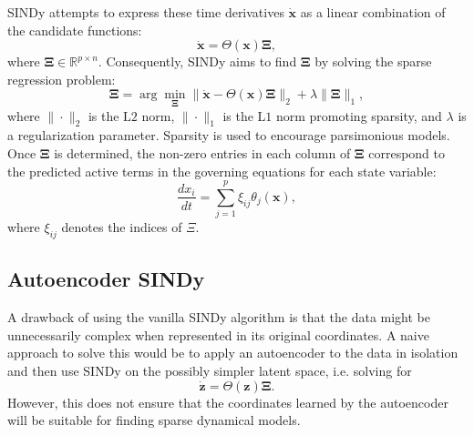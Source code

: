 SINDy attempts to express these time derivatives $\dot{\mathbf{x}}$ as a linear combination of the candidate functions:
\begin{equation}
    \dot{\mathbf{x}}=\Theta(\mathbf{x}) \boldsymbol{\Xi},
    \label{eq:sindy_formulation}
\end{equation}
where $\boldsymbol{\Xi} \in \mathbb{R}^{p \times n}$. Consequently, SINDy aims to find $\boldsymbol{\Xi}$ by solving the sparse regression problem:
\begin{equation}
    \boldsymbol{\Xi}=\arg \min _{\boldsymbol{\Xi}}\|\dot{\mathbf{x}}-\Theta(\mathbf{x}) \boldsymbol{\Xi}\|_2+\lambda\|\boldsymbol{\Xi}\|_1,
    \label{eq:sindy_loss}
\end{equation}
where $\|\cdot\|_2$ is the $\mathrm{L} 2$ norm, $\|\cdot\|_1$ is the $\mathrm{L} 1$ norm promoting sparsity, and $\lambda$ is a regularization parameter. Sparsity is used to encourage parsimonious models. Once $\boldsymbol{\Xi}$ is determined, the non-zero entries in each column of $\boldsymbol{\Xi}$ correspond to the predicted active terms in the governing equations for each state variable:
\begin{equation}
\frac{d x_i}{d t}=\sum_{j=1}^p \xi_{ij} \theta_j(\mathbf{x}),    
\end{equation}
where $\xi_{ij}$ denotes the indices of $\Xi$.
\subsection{Autoencoder SINDy}
A drawback of using the vanilla SINDy algorithm is that the data might be unnecessarily complex when represented in its original coordinates. 
A naive approach to solve this would be to apply an autoencoder to the data in isolation and then use SINDy on the possibly simpler latent space, i.e. solving for
\begin{equation}
    \dot{\mathbf{z}}=\Theta(\mathbf{z}) \boldsymbol{\Xi}.
\end{equation}
However, this does not ensure that the coordinates learned by the autoencoder will be suitable for finding sparse dynamical models. 

